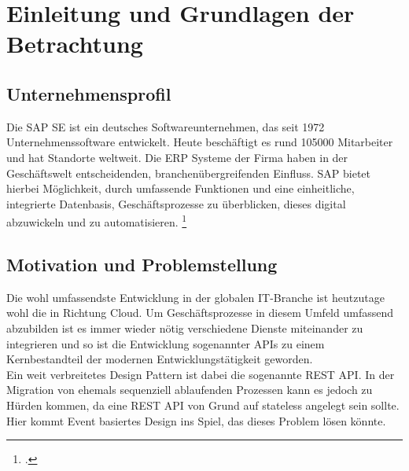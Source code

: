 \section{Einleitung und Grundlagen der Betrachtung}

\subsection{Unternehmensprofil}
Die SAP SE ist ein deutsches Softwareunternehmen, das seit 1972 Unternehmenssoftware entwickelt. Heute beschäftigt es rund 105000 Mitarbeiter und hat Standorte weltweit. Die \ac{ERP} Systeme der Firma haben in der Geschäftswelt entscheidenden, branchenübergreifenden Einfluss. SAP bietet hierbei Möglichkeit, durch umfassende Funktionen und eine einheitliche, integrierte Datenbasis, Geschäftsprozesse zu überblicken, dieses digital abzuwickeln und zu automatisieren. \footcite[Vgl.][]{sapse_was}


\subsection{Motivation und Problemstellung}
Die wohl umfassendste Entwicklung in der globalen \ac{IT}-Branche ist heutzutage wohl die in Richtung Cloud. Um Geschäftsprozesse in diesem Umfeld umfassend abzubilden ist es immer wieder nötig verschiedene Dienste miteinander zu integrieren und so ist die Entwicklung sogenannter APIs zu einem Kernbestandteil der modernen Entwicklungstätigkeit geworden.
\\Ein weit verbreitetes Design Pattern ist dabei die sogenannte \ac{REST} \ac{API}. In der Migration von ehemals sequenziell ablaufenden Prozessen kann es jedoch zu Hürden kommen, da eine \ac{REST} \ac{API} von Grund auf stateless angelegt sein sollte. Hier kommt Event basiertes Design ins Spiel, das dieses Problem lösen könnte.


